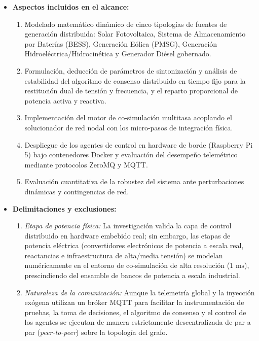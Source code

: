 \begin{itemize}
    \item \textbf{Aspectos incluidos en el alcance:}
    \begin{enumerate}[1.]
        \item Modelado matemático dinámico de cinco tipologías de fuentes de generación distribuida: Solar Fotovoltaica, Sistema de Almacenamiento por Baterías (BESS), Generación Eólica (PMSG), Generación Hidroeléctrica/Hidrocinética y Generador Diésel gobernado.
        \item Formulación, deducción de parámetros de sintonización y análisis de estabilidad del algoritmo de consenso distribuido en tiempo fijo para la restitución dual de tensión y frecuencia, y el reparto proporcional de potencia activa y reactiva.
        \item Implementación del motor de co-simulación multitasa acoplando el solucionador de red nodal con los micro-pasos de integración física.
        \item Despliegue de los agentes de control en hardware de borde (Raspberry Pi 5) bajo contenedores Docker y evaluación del desempeño telemétrico mediante protocolos ZeroMQ y MQTT.
        \item Evaluación cuantitativa de la robustez del sistema ante perturbaciones dinámicas y contingencias de red.
    \end{enumerate}
    
    \item \textbf{Delimitaciones y exclusiones:}
    \begin{enumerate}[1.]
        \item \textit{Etapa de potencia física:} La investigación valida la capa de control distribuido en hardware embebido real; sin embargo, las etapas de potencia eléctrica (convertidores electrónicos de potencia a escala real, reactancias e infraestructura de alta/media tensión) se modelan numéricamente en el entorno de co-simulación de alta resolución ($1\text{ ms}$), prescindiendo del ensamble de bancos de potencia a escala industrial.
        \item \textit{Naturaleza de la comunicación:} Aunque la telemetría global y la inyección exógena utilizan un bróker MQTT para facilitar la instrumentación de pruebas, la toma de decisiones, el algoritmo de consenso y el control de los agentes se ejecutan de manera estrictamente descentralizada de par a par (\textit{peer-to-peer}) sobre la topología del grafo.
    \end{enumerate}
\end{itemize}
